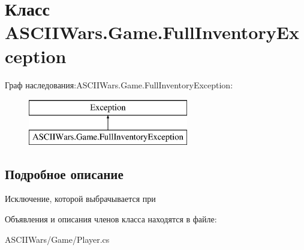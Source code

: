 \hypertarget{class_a_s_c_i_i_wars_1_1_game_1_1_full_inventory_exception}{}\section{Класс A\+S\+C\+I\+I\+Wars.\+Game.\+Full\+Inventory\+Exception}
\label{class_a_s_c_i_i_wars_1_1_game_1_1_full_inventory_exception}
Граф наследования\+:A\+S\+C\+I\+I\+Wars.\+Game.\+Full\+Inventory\+Exception\+:\begin{figure}[H]
\begin{center}
\leavevmode
\includegraphics[height=2.000000cm]{class_a_s_c_i_i_wars_1_1_game_1_1_full_inventory_exception}
\end{center}
\end{figure}


\subsection{Подробное описание}
Исключение, которой выбрачывается при 

Объявления и описания членов класса находятся в файле\+:\begin{DoxyCompactItemize}
\item 
A\+S\+C\+I\+I\+Wars/\+Game/Player.\+cs\end{DoxyCompactItemize}
